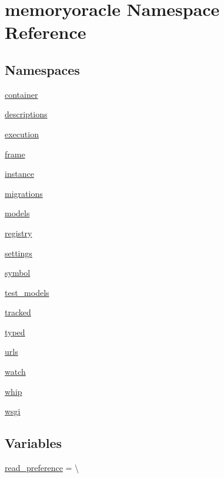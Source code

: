 \hypertarget{namespacememoryoracle}{}\section{memoryoracle Namespace Reference}
\label{namespacememoryoracle}
\subsection*{Namespaces}
\begin{DoxyCompactItemize}
\item 
 \hyperlink{namespacememoryoracle_1_1container}{container}
\item 
 \hyperlink{namespacememoryoracle_1_1descriptions}{descriptions}
\item 
 \hyperlink{namespacememoryoracle_1_1execution}{execution}
\item 
 \hyperlink{namespacememoryoracle_1_1frame}{frame}
\item 
 \hyperlink{namespacememoryoracle_1_1instance}{instance}
\item 
 \hyperlink{namespacememoryoracle_1_1migrations}{migrations}
\item 
 \hyperlink{namespacememoryoracle_1_1models}{models}
\item 
 \hyperlink{namespacememoryoracle_1_1registry}{registry}
\item 
 \hyperlink{namespacememoryoracle_1_1settings}{settings}
\item 
 \hyperlink{namespacememoryoracle_1_1symbol}{symbol}
\item 
 \hyperlink{namespacememoryoracle_1_1test__models}{test\+\_\+models}
\item 
 \hyperlink{namespacememoryoracle_1_1tracked}{tracked}
\item 
 \hyperlink{namespacememoryoracle_1_1typed}{typed}
\item 
 \hyperlink{namespacememoryoracle_1_1urls}{urls}
\item 
 \hyperlink{namespacememoryoracle_1_1watch}{watch}
\item 
 \hyperlink{namespacememoryoracle_1_1whip}{whip}
\item 
 \hyperlink{namespacememoryoracle_1_1wsgi}{wsgi}
\end{DoxyCompactItemize}
\subsection*{Variables}
\begin{DoxyCompactItemize}
\item 
\hyperlink{namespacememoryoracle_a5b6a7d01e361b06ca948d2b08c0ff10b}{read\+\_\+preference} = \textbackslash{}
\end{DoxyCompactItemize}


